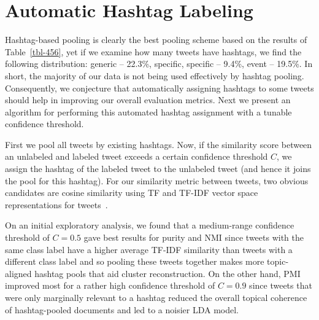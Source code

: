 \documentclass{sig-alternate}
\begin{document}

\section{Automatic Hashtag Labeling}

Hashtag-based pooling is clearly the best pooling scheme based on the
results of Table~\ref{tbl-456}, yet if we examine how many tweets have
hashtags, we find the following distribution: generic -- 22.3\%,
specific, specific -- 9.4\%, event -- 19.5\%.  In short, the majority
of our data is not being used effectively by hashtag pooling.
Consequently, we conjecture that automatically assigning hashtags to
some tweets should help in improving our overall evaluation metrics.
Next we present an algorithm for performing this automated hashtag
assignment with a tunable confidence threshold.

\vspace{1mm}  First we pool
all tweets by existing hashtags.  Now, if the similarity score between
an unlabeled and labeled tweet exceeds a certain confidence threshold
$C$, we assign the hashtag of the labeled tweet to the unlabeled tweet
(and hence it joins the pool for this hashtag).  For our similarity
metric between tweets, two obvious candidates are cosine similarity
using TF and TF-IDF vector space representations for
tweets~\cite{salton83Introduction}.  

On an initial exploratory analysis, we found that a medium-range confidence
threshold of $C=0.5$ gave best results for purity and NMI since
tweets with the same class label have a higher average TF-IDF
similarity than tweets with a different class label and so pooling
these tweets together makes more topic-aligned hashtag pools that aid
cluster reconstruction.  On the other hand, PMI improved most for
a rather high confidence threshold of $C=0.9$ since tweets that were only
marginally relevant to a hashtag reduced the overall topical coherence of
hashtag-pooled documents and led to a noisier LDA model.
\end{document}
